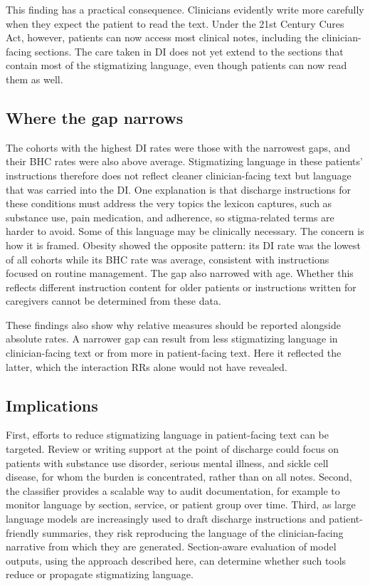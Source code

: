 This finding has a practical consequence. Clinicians evidently write more carefully when they expect the patient to read the text. Under the 21st Century Cures Act, however, patients can now access most clinical notes, including the clinician-facing sections.\cite{onc2020cures} The care taken in DI does not yet extend to the sections that contain most of the stigmatizing language, even though patients can now read them as well.

\subsection{Where the gap narrows}
The cohorts with the highest DI rates were those with the narrowest gaps, and their BHC rates were also above average. Stigmatizing language in these patients' instructions therefore does not reflect cleaner clinician-facing text but language that was carried into the DI. One explanation is that discharge instructions for these conditions must address the very topics the lexicon captures, such as substance use, pain medication, and adherence, so stigma-related terms are harder to avoid. Some of this language may be clinically necessary. The concern is how it is framed. Obesity showed the opposite pattern: its DI rate was the lowest of all cohorts while its BHC rate was average, consistent with instructions focused on routine management. The gap also narrowed with age. Whether this reflects different instruction content for older patients or instructions written for caregivers cannot be determined from these data.

These findings also show why relative measures should be reported alongside absolute rates. A narrower gap can result from less stigmatizing language in clinician-facing text or from more in patient-facing text. Here it reflected the latter, which the interaction RRs alone would not have revealed.

\subsection{Implications}
First, efforts to reduce stigmatizing language in patient-facing text can be targeted. Review or writing support at the point of discharge could focus on patients with substance use disorder, serious mental illness, and sickle cell disease, for whom the burden is concentrated, rather than on all notes. Second, the classifier provides a scalable way to audit documentation, for example to monitor language by section, service, or patient group over time. Third, as large language models are increasingly used to draft discharge instructions and patient-friendly summaries,\cite{zaretsky2024generative} they risk reproducing the language of the clinician-facing narrative from which they are generated. Section-aware evaluation of model outputs, using the approach described here, can determine whether such tools reduce or propagate stigmatizing language.
